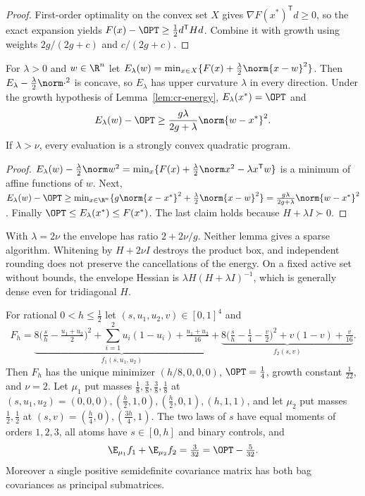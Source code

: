 \begin{proof}
First-order optimality on the convex set $X$ gives
$\nabla F(x^*)^{\mathsf T}d\ge0$, so the exact expansion yields
$F(x)-\OPT\ge\frac12d^{\mathsf T}Hd$. Combine it with growth using weights
$2g/(2g+c)$ and $c/(2g+c)$.
\end{proof}

\begin{lemma}\label{lem:cr-envelope}
For $\lambda>0$ and $w\in\R^n$ let
$E_\lambda(w)=\min_{x\in X}\{F(x)+\frac\lambda2\norm{x-w}^2\}$. Then
$E_\lambda-\frac\lambda2\norm\cdot^2$ is concave, so $E_\lambda$ has upper
curvature $\lambda$ in every direction. Under the growth hypothesis of
Lemma~\ref{lem:cr-energy}, $E_\lambda(x^*)=\OPT$ and
\[
E_\lambda(w)-\OPT\ge\frac{g\lambda}{2g+\lambda}\norm{w-x^*}^2.
\]
If $\lambda>\nu$, every evaluation is a strongly convex quadratic program.
\end{lemma}

\begin{proof}
$E_\lambda(w)-\frac\lambda2\norm w^2=\min_x\{F(x)+\frac\lambda2\norm x^2-\lambda x^{\mathsf T}w\}$
is a minimum of affine functions of $w$. Next,
$E_\lambda(w)-\OPT\ge\min_{x\in\R^n}\{g\norm{x-x^*}^2+\frac\lambda2\norm{x-w}^2\}
=\frac{g\lambda}{2g+\lambda}\norm{w-x^*}^2$. Finally $\OPT\le E_\lambda(x^*)\le F(x^*)$.
The last claim holds because $H+\lambda I\succ0$.
\end{proof}

With $\lambda=2\nu$ the envelope has ratio $2+2\nu/g$. Neither lemma gives a
sparse algorithm. Whitening by $H+2\nu I$ destroys the product box, and
independent rounding does not preserve the cancellations of the energy. On a
fixed active set without bounds, the envelope Hessian is
$\lambda H(H+\lambda I)^{-1}$, which is generally dense even for tridiagonal
$H$.

\begin{proposition}\label{prop:cr-moment}
For rational $0<h\le\frac12$ let $(s,u_1,u_2,v)\in[0,1]^4$ and
\[
F_h=\underbrace{8\bigl(\tfrac sh-\tfrac{u_1+u_2}2\bigr)^2+\textstyle\sum_{i=1}^2u_i(1-u_i)
+\tfrac{u_1+u_2}{16}}_{f_1(s,u_1,u_2)}
+\underbrace{8\bigl(\tfrac sh-\tfrac14-\tfrac v2\bigr)^2+v(1-v)+\tfrac v{16}}_{f_2(s,v)}.
\]
Then $F_h$ has the unique minimizer $(h/8,0,0,0)$, $\OPT=\frac14$, growth
constant $\frac1{22}$, and $\nu=2$. Let $\mu_1$ put masses
$\frac18,\frac38,\frac38,\frac18$ at
$(s,u_1,u_2)=(0,0,0),(\frac h2,1,0),(\frac h2,0,1),(h,1,1)$, and let $\mu_2$ put
masses $\frac12,\frac12$ at $(s,v)=(\frac h4,0),(\frac{3h}4,1)$. The two
laws of $s$ have equal moments of orders $1,2,3$, all atoms have $s\in[0,h]$
and binary controls, and
\[
\E_{\mu_1}f_1+\E_{\mu_2}f_2=\tfrac3{32}=\OPT-\tfrac5{32}.
\]
Moreover a single positive semidefinite covariance matrix has both bag
covariances as principal submatrices.
\end{proposition}


